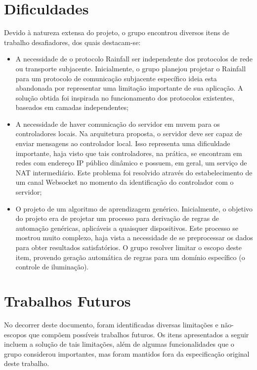 \section{Dificuldades} \label{sec:dificuldades}
Devido à natureza extensa do projeto, o grupo encontrou diversos itens de trabalho desafiadores, dos quais destacam-se:

\begin{itemize}
	\item A necessidade de o protocolo Rainfall ser independente dos protocolos de rede ou transporte subjacente. Inicialmente, o grupo planejou projetar o Rainfall para um protocolo de comunicação subjacente específico ideia esta abandonada por representar uma limitação importante de sua aplicação. A solução obtida foi inspirada no funcionamento dos protocolos existentes, baseados em camadas independentes;
	
	\item A necessidade de haver comunicação do servidor em nuvem para os controladores locais. Na arquitetura proposta, o servidor deve ser capaz de enviar mensagens ao controlador local. Isso representa uma dificuldade importante, haja visto que tais controladores, na prática, se encontram em redes com endereço IP público dinâmico e possuem, em geral, um serviço de NAT intermediário. Este problema foi resolvido através do estabelecimento de um canal Websocket no momento da identificação do controlador com o servidor;
	
	\item O projeto de um algoritmo de aprendizagem genérico. Inicialmente, o objetivo do projeto era de projetar um processo para derivação de regras de automação genéricas, aplicáveis a quaisquer dispositivos. Este processo se mostrou muito complexo, haja vista a necessidade de se preprocessar os dados para obter resultados satisfatórios. O grupo resolver limitar o escopo deste item, provendo geração automática de regras para um domínio específico (o controle de iluminação).
\end{itemize}

\section{Trabalhos Futuros} \label{sec:trabalhos_futuros}
No decorrer deste documento, foram identificadas diversas limitações e não-escopos que compõem possíveis trabalhos futuros. Os itens apresentados a seguir incluem a solução de tais limitações, além de algumas funcionalidades que o grupo considerou importantes, mas foram mantidos fora da especificação original deste trabalho.

